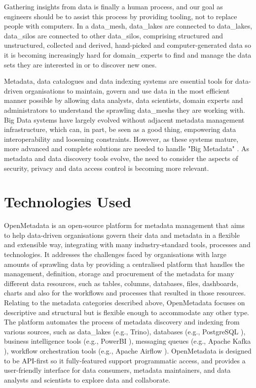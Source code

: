 Gathering insights from data is finally a human process, and our goal as engineers should be to assist this process by providing tooling, not to replace people with computers. In a \gls{data_mesh}, \glspl{data_lake} are connected to \glspl{data_lake}, \glspl{data_silo} are connected to other \glspl{data_silo}, comprising structured and unstructured, collected and derived, hand-picked and computer-generated data so it is becoming increasingly hard for \glspl{domain_expert} to find and manage the data sets they are interested in or to discover new ones.

Metadata, data catalogues and data indexing systems are essential tools for data-driven organisations to maintain, govern and use data in the most efficient manner possible by allowing data analysts, data scientists, domain experts and administrators to understand the sprawling \glspl{data_mesh} they are working with. Big Data systems have largely evolved without adjacent metadata management infrastructure, which can, in part, be seen as a good thing, empowering data interoperability and loosening constraints. However, as these systems mature, more advanced and complete solutions are needed to handle "Big Metadata" \cite{bigMetadataSmith2014}. As metadata and data discovery tools evolve, the need to consider the aspects of security, privacy and data access control is becoming more relevant.

\section{Technologies Used}

OpenMetadata is an open-source platform for metadata management that aims to help data-driven organisations govern their data and metadata in a flexible and extensible way, integrating with many industry-standard tools, processes and technologies. It addresses the challenges faced by organisations with large amounts of sprawling data by providing a centralised platform that handles the management, definition, storage and procurement of the metadata for many different data resources, such as tables, columns, databases, files, dashboards, charts and also for the workflows and processes that resulted in those resources. Relating to the metadata categories described above, OpenMetadata focuses on descriptive and structural but is flexible enough to accommodate any other type. The platform automates the process of metadata discovery and indexing from various sources, such as \glspl{data_lake} (e.g., Trino), databases (e.g., PostgreSQL \cite{postgresqlTech}), business intelligence tools (e.g., PowerBI \cite{powerbiTech}), messaging queues (e.g., Apache Kafka \cite{apacheKafkaTech}), workflow orchestration tools (e.g., Apache Airflow \cite{apacheAirflowTech}). OpenMetadata is designed to be API-first \cite{apiFirstBealieu} so it fully-featured support programmatic access, and provides a user-friendly interface for data consumers, metadata maintainers, and data analysts and scientists to explore data and collaborate.

